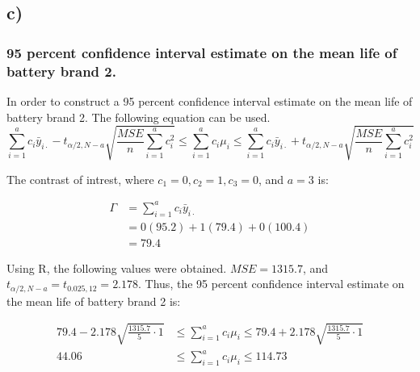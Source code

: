 \documentclass{article}
\begin{document}
\clearpage
\subsection*{c)}
\subsubsection*{95 percent confidence interval estimate on
the mean life of battery brand 2.}
In order to construct a 95 percent confidence interval estimate on
the mean life of battery brand 2. The following equation can be used. \\
\begin{equation*}
    \sum_{i=1}^{a} c_i \bar{y}_{i \cdot} - t_{\alpha/2, N-a} \sqrt{\frac{MSE}{n} \sum_{i=1}^{a} c_i^2}
    \leq \sum_{i=1}^{a} c_i \mu_i \leq
    \sum_{i=1}^{a} c_i \bar{y}_{i \cdot} + t_{\alpha/2, N-a} \sqrt{\frac{MSE}{n} \sum_{i=1}^{a} c_i^2}
\end{equation*}
\begin{flushleft}
The contrast of intrest, where $c_1 = 0, c_2 = 1, c_3 = 0$, and $a = 3$ is:
\end{flushleft}
\begin{align*}
    \Gamma &=  \sum_{i=1}^{a} c_i \bar{y}_{i \cdot} \\
                &= 0(95.2) + 1(79.4) + 0(100.4) \\
                &= 79.4 
    \end{align*}
\begin{flushleft}
  Using R, the following values were obtained. $MSE = 1315.7$, and $t_{\alpha/2,N-a} = t_{0.025,12} = 2.178$.
  Thus, the 95 percent confidence interval estimate on
  the mean life of battery brand 2 is:
\end{flushleft}
\begin{align*}
  79.4 - 2.178 \sqrt{\frac{1315.7}{5} \cdot 1}
  &\leq \sum_{i=1}^{a} c_i \mu_i \leq
  79.4 + 2.178 \sqrt{\frac{1315.7}{5} \cdot 1} \\
  44.06
  &\leq \sum_{i=1}^{a} c_i \mu_i \leq
  114.73 \\
\end{align*}
\end{document}
